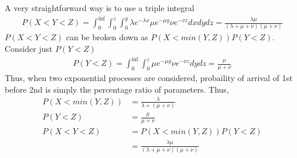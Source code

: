 \documentclass[../../probability-notes.tex]{subfiles}
\begin{document}
        A very straightforward way is to use a triple integral
        \begin{align*}
            P(X < Y < Z) = \int_{0}^{\inf} \int_{0}^{z} \int_{0}^{y} \lambda e^{-\lambda x} \mu e^{-\mu y} \nu e^{-\nu z} dx dy dz = \frac{\lambda \mu}{(\lambda + \mu + \nu)(\mu + \nu)}
        \end{align*}
        $P(X < Y < Z)$ can be broken down as $P(X < min(Y,Z)) P(Y < Z)$.\newline
        Consider just $P(Y < Z)$
        \begin{align*}
            P(Y < Z) = \int_{0}^{\inf} \int_{0}^{z} \mu e^{-\mu y} \nu e^{-\nu z} dy dz = \frac{\mu}{\mu + \nu}
        \end{align*}
        Thus, when two exponential processes are considered, probaility of arrival of 1st before 2nd is simply the percentage ratio of parameters. Thus,
        \begin{align*}
            P(X < min(Y,Z)) &= \frac{\lambda}{\lambda + (\mu + \nu)} \tag*{$Y$ and $Z$ can be combined as a single process}\\
            P(Y < Z) &= \frac{\mu}{\mu + \nu}\\
            P(X < Y < Z) &= P(X < min(Y,Z)) P(Y < Z)\\
                        &= \frac{\lambda \mu}{(\lambda + \mu + \nu)(\mu + \nu)}
        \end{align*}
\end{document}
